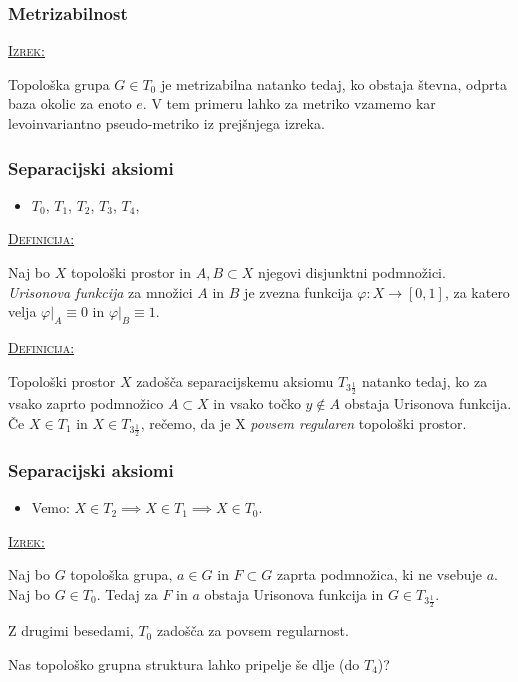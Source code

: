 \documentclass[a4paper, 12pt]{beamer}
\newenvironment{matematika}[1]{
\textcolor{bostonuniversityred}{\underline{\textsc{#1:}}}
}{
}
\begin{document}
\begin{frame}
\frametitle{Metrizabilnost}
\begin{matematika}{Izrek}
Topološka grupa $G \in T_0$ je metrizabilna natanko tedaj, ko obstaja števna, odprta baza okolic za enoto $e$. V tem primeru lahko za metriko vzamemo kar levoinvariantno pseudo-metriko iz prejšnjega izreka. 
\end{matematika}
\end{frame}

\begin{frame}
\frametitle{Separacijski aksiomi}
\begin{itemize}[label=]
\item $T_0$, $T_1$, $T_2$, $T_3$, $T_4$,
\end{itemize}

\pause

\begin{matematika}{Definicija}
Naj bo $X$ topološki prostor in $A,B \subset X$ njegovi disjunktni podmnožici. \emph{Urisonova funkcija} za množici $A$ in $B$ je zvezna funkcija $\varphi : X \to [0,1]$, za katero velja $\varphi |_A \equiv 0$ in $\varphi |_B \equiv 1$.
\end{matematika}
\newline

\pause

\begin{matematika}{Definicija}
Topološki prostor $X$ zadošča separacijskemu aksiomu $T_{3 \frac{1}{2}}$ natanko tedaj, ko za vsako zaprto podmnožico $A \subset X$ in vsako točko $y \notin A$ obstaja Urisonova funkcija. \\
Če $X \in T_1$ in $X \in T_{3 \frac{1}{2}}$, rečemo, da je X \emph{povsem regularen} topološki prostor.
\end{matematika}

\end{frame}

\begin{frame}
\frametitle{Separacijski aksiomi}
\begin{itemize}[label=]
\item Vemo: $X \in T_2 \implies X \in T_1 \implies X \in T_0$.
\end{itemize}

\pause

\begin{matematika}{Izrek}
Naj bo $G$ topološka grupa, $a \in G$ in $F \subset G$ zaprta podmnožica, ki ne vsebuje $a$. Naj bo $G \in T_0$. Tedaj za $F$ in $a$ obstaja Urisonova funkcija in $G \in T_{3 \frac{1}{2}}$.
\end{matematika}
\newline

\pause

Z drugimi besedami, $T_0$ zadošča za povsem regularnost.
\newline

\pause

Nas topološko grupna struktura lahko pripelje še dlje (do $T_4$)?

\end{frame}
\end{document}
